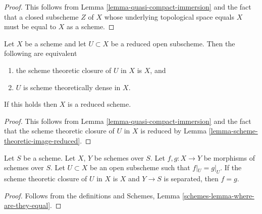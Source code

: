 \begin{proof}
This follows from
Lemma \ref{lemma-quasi-compact-immersion}
and the fact that a closed subscheme $Z$ of $X$ whose
underlying topological space equals $X$ must be equal to $X$
as a scheme.
\end{proof}

\begin{lemma}
\label{lemma-reduced-subscheme-closure}
Let $X$ be a scheme and let $U \subset X$ be a reduced open subscheme.
Then the following are equivalent
\begin{enumerate}
\item the scheme theoretic closure of $U$ in $X$ is $X$, and
\item $U$ is scheme theoretically dense in $X$.
\end{enumerate}
If this holds then $X$ is a reduced scheme.
\end{lemma}

\begin{proof}
This follows from
Lemma \ref{lemma-quasi-compact-immersion}
and the fact that the scheme theoretic closure of $U$ in $X$ is
reduced by
Lemma \ref{lemma-scheme-theoretic-image-reduced}.
\end{proof}


\begin{lemma}
\label{lemma-equality-of-morphisms}
Let $S$ be a scheme. Let $X$, $Y$ be schemes over $S$.
Let $f, g : X \to Y$ be morphisms of schemes over $S$.
Let $U \subset X$ be an open subscheme such that
$f|_U = g|_U$. If the scheme theoretic closure of $U$
in $X$ is $X$ and $Y \to S$ is separated, then $f = g$.
\end{lemma}

\begin{proof}
Follows from the definitions and
Schemes, Lemma \ref{schemes-lemma-where-are-they-equal}.
\end{proof}




